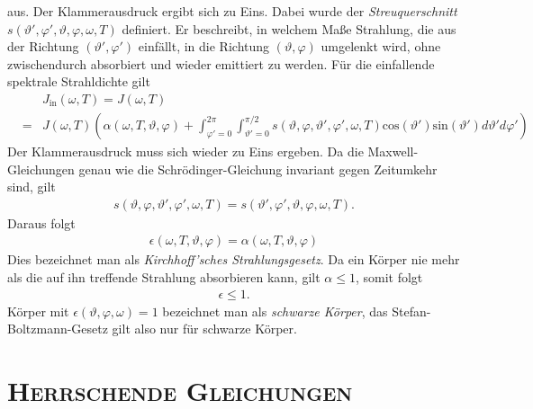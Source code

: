 \documentclass{book}
\renewcommand{\sin}{\text{sin}}
\renewcommand{\cos}{\text{cos}}
\begin{document}
%
aus. Der Klammerausdruck ergibt sich zu Eins. Dabei wurde der \textit{Streuquerschnitt} $s\left(\vartheta', \varphi', \vartheta, \varphi, \omega, T\right)$ definiert. Er beschreibt, in welchem Maße Strahlung, die aus der Richtung $\left(\vartheta', \varphi'\right)$ einfällt, in die Richtung $\left(\vartheta, \varphi\right)$ umgelenkt wird, ohne zwischendurch absorbiert und wieder emittiert zu werden. Für die einfallende spektrale Strahldichte gilt
%
\begin{eqnarray}
&&J_\text{in}\left(\omega, T\right) = J\left(\omega, T\right)\nonumber\\
& = & J\left(\omega, T\right)\left(\alpha\left(\omega, T, \vartheta, \varphi\right) + \int_{\varphi' = 0}^{2\pi}\int_{\vartheta' = 0}^{\pi/2}s\left(\vartheta, \varphi, \vartheta', \varphi', \omega, T\right)\cos\left(\vartheta'\right)\sin\left(\vartheta'\right)d\vartheta'd\varphi'\right)
\end{eqnarray}
%
Der Klammerausdruck muss sich wieder zu Eins ergeben. Da die Maxwell-Gleichungen genau wie die Schrödinger-Gleichung invariant gegen Zeitumkehr sind, gilt
%
\begin{eqnarray}
s\left(\vartheta, \varphi, \vartheta', \varphi', \omega, T\right) = s\left(\vartheta', \varphi', \vartheta, \varphi, \omega, T\right).
\end{eqnarray}
%
Daraus folgt
%
\begin{eqnarray}
\epsilon\left(\omega, T, \vartheta, \varphi\right) = \alpha\left(\omega, T, \vartheta, \varphi\right)
\end{eqnarray}
%
Dies bezeichnet man als \textit{Kirchhoff'sches Strahlungsgesetz}. Da ein Körper nie mehr als die auf ihn treffende Strahlung absorbieren kann, gilt $\alpha\leq1$, somit folgt
%
\begin{eqnarray}
\epsilon\leq1.
\end{eqnarray}
%
Körper mit $\epsilon\left(\vartheta, \varphi, \omega\right) = 1$ bezeichnet man als \textit{schwarze Körper},  das Stefan-Boltzmann-Gesetz gilt also nur für schwarze Körper.

\chapter{\normalfont\textsc{Herrschende Gleichungen}}
\label{sec:herrschende_gleichungen}
\end{document}
